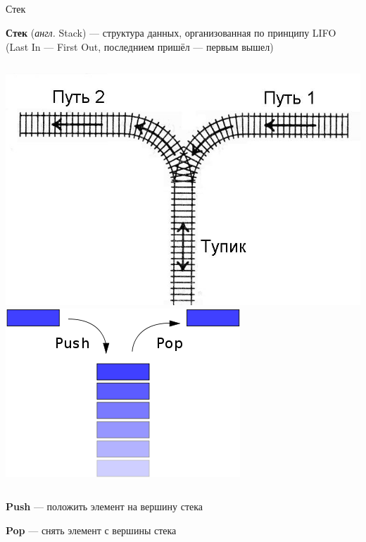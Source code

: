 \documentclass[utf8, russian]{beamer}
\begin{document}
    \subsection{}
    \begin{frame}{Стек}

        {\bf Стек } ({\it англ.} Stack) --- структура данных, организованная по принципу LIFO (Last In --- First Out, последнием пришёл --- первым вышел)
    \begin{columns}
            \includegraphics[width=\linewidth]{fig/stack_rails.jpg}
            \includegraphics[width=\linewidth]{fig/stack.png}
    \end{columns}
    {\bf Push} --- положить элемент на вершину стека

    {\bf Pop} --- снять элемент с вершины стека
    \end{frame}
\end{document}
